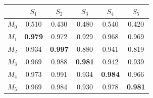 \begin{tabular}{lccccc}
\toprule
 & $S_1$ & $S_2$ & $S_3$ & $S_4$ & $S_5$ \\
\midrule
$M_0$ & 0.510 & 0.430 & 0.480 & 0.540 & 0.420 \\
\midrule
$M_1$ & \textbf{0.979} & 0.972 & 0.929 & 0.968 & 0.969 \\
$M_2$ & 0.934 & \textbf{0.997} & 0.880 & 0.941 & 0.819 \\
$M_3$ & 0.969 & 0.988 & \textbf{0.981} & 0.942 & 0.939 \\
$M_4$ & 0.973 & 0.991 & 0.934 & \textbf{0.984} & 0.966 \\
$M_5$ & 0.969 & 0.984 & 0.930 & 0.978 & \textbf{0.981} \\
\bottomrule
\end{tabular}
